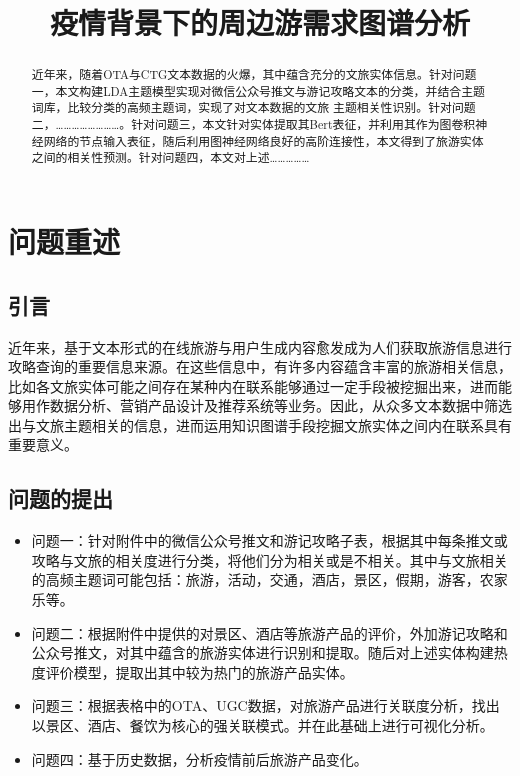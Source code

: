 \documentclass[bwprint]{gmcmthesis}
\title{疫情背景下的周边游需求图谱分析}
\begin{document}
 \maketitle

\begin{abstract}
近年来，随着OTA与CTG文本数据的火爆，其中蕴含充分的文旅实体信息。针对问题一，本文构建LDA主题模型实现对微信公众号推文与游记攻略文本的分类，并结合主题词库，比较分类的高频主题词，实现了对文本数据的文旅 主题相关性识别。针对问题二，……………………。针对问题三，本文针对实体提取其Bert表征，并利用其作为图卷积神经网络的节点输入表征，随后利用图神经网络良好的高阶连接性，本文得到了旅游实体之间的相关性预测。针对问题四，本文对上述……………


\end{abstract}

\pagestyle{plain}


\section{问题重述}

\subsection{引言}

近年来，基于文本形式的在线旅游与用户生成内容愈发成为人们获取旅游信息进行攻略查询的重要信息来源。在这些信息中，有许多内容蕴含丰富的旅游相关信息，比如各文旅实体可能之间存在某种内在联系能够通过一定手段被挖掘出来，进而能够用作数据分析、营销产品设计及推荐系统等业务。因此，从众多文本数据中筛选出与文旅主题相关的信息，进而运用知识图谱手段挖掘文旅实体之间内在联系具有重要意义。

\subsection{问题的提出}

\begin{itemize}
	\item 问题一：针对附件中的微信公众号推文和游记攻略子表，根据其中每条推文或攻略与文旅的相关度进行分类，将他们分为相关或是不相关。其中与文旅相关的高频主题词可能包括：旅游，活动，交通，酒店，景区，假期，游客，农家乐等。
 
	\item 问题二：根据附件中提供的对景区、酒店等旅游产品的评价，外加游记攻略和公众号推文，对其中蕴含的旅游实体进行识别和提取。随后对上述实体构建热度评价模型，提取出其中较为热门的旅游产品实体。
 
	\item 问题三：根据表格中的OTA、UGC数据，对旅游产品进行关联度分析，找出以景区、酒店、餐饮为核心的强关联模式。并在此基础上进行可视化分析。
 
	\item 问题四：基于历史数据，分析疫情前后旅游产品变化。
\end{itemize}
\end{document}
